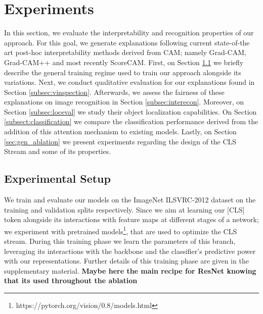 \section{Experiments}
In this section, we evaluate the interpretability and recognition properties of our approach. For this goal,  we generate explanations following current state-of-the art post-hoc interpretability methods derived from CAM\cite{DBLP:journals/corr/HeZRS15}; namely Grad-CAM\cite{DBLP:journals/corr/SelvarajuDVCPB16}, Grad-CAM++\cite{DBLP:journals/corr/abs-1710-11063} and most recently ScoreCAM\cite{DBLP:journals/corr/abs-1910-01279}. First, on Section \ref{subsec:setup} we briefly describe the general training regime used to train our approach alongside its variations. Next, we conduct qualitative evaluation for our explanations found in Section \ref{subsec:vinspection}. Afterwards, we assess the fairness of these explanations on image recognition in Section \ref{subsec:interecon}. Moreover, on Section \ref{subsec:loceval} we study their object localization capabilities. On Section \ref{subsect:classification} we compare the classification performance derived from the addition of this attention mechanism to existing models. Lastly, on Section \ref{sec:gen_ablation} we present experiments regarding the design of the CLS Stream and some of its properties.

\subsection{Experimental Setup}\label{subsec:setup}
We train and evaluate our models on the ImageNet ILSVRC-2012 dataset\cite{deng2009imagenet} on the training and validation splits respectively. Since we aim at learning our [CLS] token alongside its interactions with feature maps at different stages of a network; we experiment with pretrained models\footnote{https://pytorch.org/vision/0.8/models.html}, that are used to optimize the CLS stream. During this training phase we learn the parameters of this branch, leveraging its interactions with the backbone and the classifier's predictive power with our representations. Further details of this training phase are given in the supplementary material. \textbf{Maybe here the main recipe for ResNet knowing that its used throughout the ablation}\\

